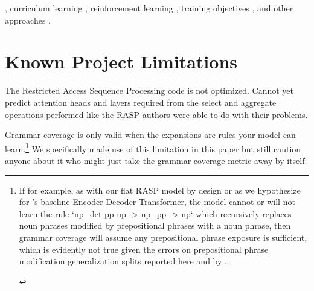 \documentclass[11pt]{article}
\begin{document}
{\begin{footnotesize}
\end{footnotesize}}, curriculum learning \cite{10.1145/1553374.1553380}, reinforcement learning \cite{Ranzato2015}, training objectives \cite{10.1162/tacl_a_00733}, and other approaches \cite{Csordas2021} \cite{ontanon-etal-2022-making}.

\clearpage
\section*{Known Project Limitations}

The Restricted Access Sequence Processing code is not optimized. Cannot yet predict attention heads and layers required from the select and aggregate operations performed like the RASP authors \cite{Weiss2021} were able to do with their problems.

Grammar coverage \cite{fuzzingbook2023:GrammarCoverageFuzzer} is only valid when the expansions are rules your model can learn.\footnote{\begin{footnotesize}If for example, as with our flat RASP model by design or as we hypothesize for \cite{Wu2023}'s baseline Encoder-Decoder Transformer, the model cannot or will not learn the rule `np\_det pp np -> np\_pp -> np` which recursively replaces noun phrases modified by prepositional phrases with a noun phrase, then grammar coverage will assume any prepositional phrase exposure is sufficient, which is evidently not true given the errors on prepositional phrase modification generalization splits reported here and by \cite{Wu2023}, \cite{KimLinzen2020}.
\end{footnotesize}
} We specifically made use of this limitation in this paper but still caution anyone about it who might just take the grammar coverage metric away by itself.
\end{document}
